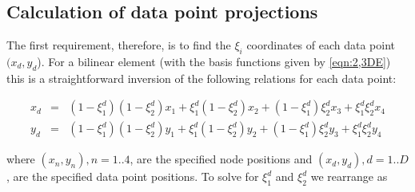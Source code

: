 \subsection{Calculation of data point projections}

The first requirement, therefore, is to find the $\xi_{i}$ coordinates of each
data point $(x_{d}, y_{d}$). For a bilinear element (with the basis functions
given by \eqref{eqn:2,3DE}) this is a straightforward inversion of the
following relations for each data point:

\begin{equation}
  \begin{array}{rcl}
    x_{d}&=&(1-\xi_{1}^{d})(1-\xi_{2}^{d})x_{1}+\xi_{1}^{d}(1-\xi_{2}^{d})x_{2}
    +(1-\xi_{1}^{d})\xi_{2}^{d}x_{3}+\xi_{1}^{d}\xi_{2}^{d}x_{4} \\
    y_{d}&=&(1-\xi_{1}^{d})(1-\xi_{2}^{d})y_{1}+\xi_{1}^{d}(1-\xi_{2}^{d})y_{2}
    +(1-\xi_{1}^{d})\xi_{2}^{d}y_{3}+\xi_{1}^{d}\xi_{2}^{d}y_{4}
  \end{array}
  \label{eqn:datapointposfield}
\end{equation}

where $(x_{n}, y_{n}), n=1..4$, are the specified node positions and
$(x_{d}, y_{d}), d=1..D$, are the specified data point positions. To solve
 for $\xi_{1}^{d}$ and $\xi_{2}^{d}$ we rearrange
 as

